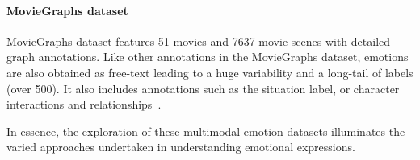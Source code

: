 \paragraph{MovieGraphs dataset~\cite{moviegraphs}}
MovieGraphs dataset features 51 movies and 7637 movie scenes with detailed graph annotations. Like other annotations in the MovieGraphs dataset, emotions are also obtained as free-text leading to a huge variability and a long-tail of labels (over 500).  It also includes annotations such as the situation label, or character interactions and relationships~\cite{lirec}.

In essence, the exploration of these multimodal emotion datasets illuminates the varied approaches undertaken in understanding emotional expressions.
